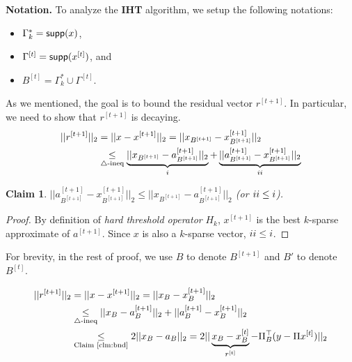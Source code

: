 \documentclass[11pt]{article}
\newtheorem{claim}[theorem]{Claim}
\def\mypar#1{\smallskip\noindent\textbf{#1}}
\newcommand{\RNum}[1]{\uppercase\expandafter{\romannumeral #1\relax}}
\begin{document}
\mypar{Notation.} To analyze the {\bf IHT} algorithm, we setup the following notations: 
\begin{itemize}
\item $\Gamma^{*}_k= {\sf supp}(x)$, 
\item $\Gamma^{[t]} = {\sf supp}(x^{[t]})$, and 
\item $B^{[t]} = \Gamma^{*}_k \cup \Gamma^{[t]}$.
\end{itemize}
As we mentioned, the goal is to bound the residual vector $r^{[t+1]}$. In particular, we need to show that $r^{[t+1]}$ is decaying. 
\begin{align*}
||r^{[t+1]}||_2 &= ||x - x^{[t+1]}||_2 = ||x_{B^{[t+1]}} - x_{B^{[t+1]}}^{[t+1]}||_2 \\
&\underset{\triangle\text{-ineq}}\leq \underbrace{||x_{B^{[t+1]}} - a^{[t+1]}_{B^{[t+1]}}||_2}_{\RNum{1}} + \underbrace{||a_{B^{[t+1]}}^{[t+1]} - x^{[t+1]}_{B^{[t+1]}}||_2}_{\RNum{2}}
\end{align*}
\begin{claim}\label{clm:bnd}
$||a_{B^{[t+1]}}^{[t+1]} - x^{[t+1]}_{B^{[t+1]}}||_2 \leq ||x_{B^{[t+1]}} - a^{[t+1]}_{B^{[t+1]}}||_2$ (or $\RNum{2} \leq \RNum{1}$).
\end{claim}
\begin{proof}
By definition of {\em hard threshold operator} $H_k$, $x^{[t+1]}$ is the best $k$-sparse approximate of $a^{[t+1]}$. Since $x$ is also a $k$-sparse vector, $\RNum{2} \leq \RNum{1}$.
\end{proof}
For brevity, in the rest of proof, we use $B$ to denote $B^{[t+1]}$ and $B'$ to denote $B^{[t]}$.

\begin{align}
||r^{[t+1]}||_2 &= ||x - x^{[t+1]}||_2 = ||x_{B} - x_{B}^{[t+1]}||_2 \nonumber \\
&\underset{\triangle\text{-ineq}}\leq ||x_{B} - a^{[t+1]}_{B}||_2 + ||a_{B}^{[t+1]} - x^{[t+1]}_{B}||_2 \nonumber \\
&\underset{\text{Claim~\ref{clm:bnd}}}\leq 2 ||x_{B} - a_B||_2 = 2 ||\underbrace{x_B - x_B^{[t]}}_{r^{[t]}} - \Pi_{B}^{\top}(y-\Pi x^{[t]})||_2 \label{eq:r}
\end{align}
\end{document}
